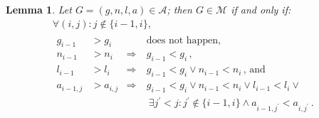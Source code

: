 \documentclass{amsart}
\theoremstyle{plain}
\newtheorem{lemma}[theorem]{Lemma}
\theoremstyle{definition}
\begin{document}
\begin{lemma}\label{lemma:char1}
  Let $G = (g, n, l, a) \in \mathcal{A}$; then $G \in \mathcal{M}$ if
  and only if:
  \begin{multline*}
    \forall (i,j)\colon
    j \not\in \{i-1, i\},\\
    \begin{aligned}
      g_{i-1} &> g_i &&\text{does not happen,}\\
      n_{i-1} &> n_i &\Rightarrow\  & g_{i-1} < g_i\,\text{,}\\
      l_{i-1} &> l_i &\Rightarrow\  & g_{i-1} < g_i \vee n_{i-1} < n_i\,\text{, and}\\
      a_{i-1,j} &> a_{i,j} &\Rightarrow\ & g_{i-1} < g_i \vee n_{i-1}
      < n_i \vee l_{i-1} < l_i \vee\\
      &&&\ \exists j^\prime < j: j^\prime \not\in \{i-1,i\} \wedge
      a_{i-1,j^\prime} < a_{i,j^\prime}\,\text{.}
    \end{aligned}
  \end{multline*}
\end{lemma}
\end{document}
